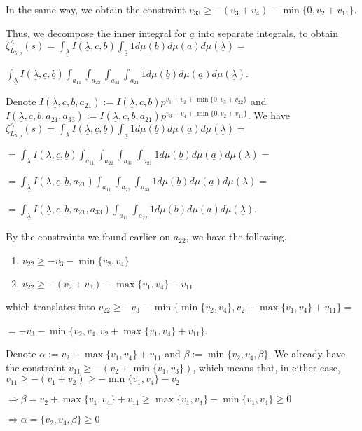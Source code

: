 \documentclass{article}
\begin{document}
In the same way, we obtain the constraint $v_{33}\geq{-(v_{3}+v_{4})-\min\{0,v_{2}+v_{11}\}}$.

Thus, we decompose the inner integral for $\underline{a}$ into separate integrals, to obtain $\zeta_{L_{5,p}}^{\wedge}(s)=\displaystyle\int_{\underline\lambda}I(\underline{\lambda},\underline{c},\underline{b})\int_{\underline{a}}1d\mu(\underline{b})d\mu(\underline{a})d\mu(\underline{\lambda})=$

$\displaystyle\int_{\underline\lambda}I(\underline{\lambda},\underline{c},\underline{b})\int_{a_{11}}\int_{a_{22}}\int_{a_{33}}\int_{a_{21}}1d\mu(\underline{b})d\mu(\underline{a})d\mu(\underline{\lambda})$.

Denote $I(\underline{\lambda},\underline{c},\underline{b},a_{21}):=I(\underline{\lambda},\underline{c},\underline{b})p^{v_{1}+v_{2}+\min\{0,v_{3}+v_{22}\}}$ and $I(\underline{\lambda},\underline{c},\underline{b},a_{21},a_{33}):=I(\underline{\lambda},\underline{c},\underline{b},a_{21})p^{v_{3}+v_{4}+\min\{0,v_{2}+v_{11}\}}$. We have $\zeta_{L_{5,p}}^{\wedge}(s)=\displaystyle\int_{\underline\lambda}I(\underline{\lambda},\underline{c},\underline{b})\int_{\underline{a}}1d\mu(\underline{b})d\mu(\underline{a})d\mu(\underline{\lambda})=$

$=\displaystyle\int_{\underline\lambda}I(\underline{\lambda},\underline{c},\underline{b})\int_{a_{11}}\int_{a_{22}}\int_{a_{33}}\int_{a_{21}}1d\mu(\underline{b})d\mu(\underline{a})d\mu(\underline{\lambda})=$

$=\displaystyle\int_{\underline\lambda}I(\underline{\lambda},\underline{c},\underline{b},a_{21})\int_{a_{11}}\int_{a_{22}}\int_{a_{33}}1d\mu(\underline{b})d\mu(\underline{a})d\mu(\underline{\lambda})=$

$=\displaystyle\int_{\underline\lambda}I(\underline{\lambda},\underline{c},\underline{b},a_{21},a_{33})\int_{a_{11}}\int_{a_{22}}1d\mu(\underline{b})d\mu(\underline{a})d\mu(\underline{\lambda})$.

By the constraints we found earlier on $a_{22}$, we have the following.
\begin{enumerate}
    \item $v_{22}\geq{-v_{3}-\min\{v_{2},v_{4}\}}$
    \item $v_{22}\geq{-(v_{2}+v_{3})-\max\{v_{1},v_{4}\}-v_{11}}$
\end{enumerate}
which translates into $v_{22}\geq{-v_{3}-\min\{\min\{v_{2},v_{4}\},v_{2}+\max\{v_{1},v_{4}\}+v_{11}\}}=$

$=-v_{3}-\min\{v_{2},v_{4},v_{2}+\max\{v_{1},v_{4}\}+v_{11}\}$.

Denote $\alpha:=v_{2}+\max\{v_{1},v_{4}\}+v_{11}$ and $\beta:=\min\{v_{2},v_{4},\beta\}$. We already have the constraint $v_{11}\geq{-(v_{2}+\min\{v_{1},v_{3}\})}$, which means that, in either case, $v_{11}\geq{-(v_{1}+v_{2})}\geq{-\min\{v_{1},v_{4}\}-v_{2}}$

$\Rightarrow{\beta=v_{2}+\max\{v_{1},v_{4}\}+v_{11}\geq{\max\{v_{1},v_{4}\}-\min\{v_{1},v_{4}\}}}\geq{0}$

$\Rightarrow{\alpha=\{v_{2},v_{4},\beta\}}\geq{0}$
\end{document}
